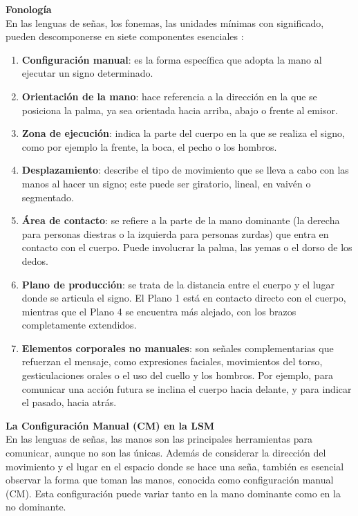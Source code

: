 \textbf{Fonología}\\
En las lenguas de señas, los fonemas, las unidades mínimas con significado, pueden descomponerse en siete componentes esenciales \cite{ref39}:

\begin{enumerate}
    \item \textbf{Configuración manual}: es la forma específica que adopta la mano al ejecutar un signo determinado.
    \item \textbf{Orientación de la mano}: hace referencia a la dirección en la que se posiciona la palma, ya sea orientada hacia arriba, abajo o frente al emisor.
    \item \textbf{Zona de ejecución}: indica la parte del cuerpo en la que se realiza el signo, como por ejemplo la frente, la boca, el pecho o los hombros.
    \item \textbf{Desplazamiento}: describe el tipo de movimiento que se lleva a cabo con las manos al hacer un signo; este puede ser giratorio, lineal, en vaivén o segmentado.
    \item \textbf{Área de contacto}: se refiere a la parte de la mano dominante (la derecha para personas diestras o la izquierda para personas zurdas) que entra en contacto con el cuerpo. Puede involucrar la palma, las yemas o el dorso de los dedos.
    \item \textbf{Plano de producción}: se trata de la distancia entre el cuerpo y el lugar donde se articula el signo. El Plano 1 está en contacto directo con el cuerpo, mientras que el Plano 4 se encuentra más alejado, con los brazos completamente extendidos.
    \item \textbf{Elementos corporales no manuales}: son señales complementarias que refuerzan el mensaje, como expresiones faciales, movimientos del torso, gesticulaciones orales o el uso del cuello y los hombros. Por ejemplo, para comunicar una acción futura se inclina el cuerpo hacia delante, y para indicar el pasado, hacia atrás.\\
\end{enumerate}

\textbf{La Configuración Manual (CM) en la LSM}\\
En las lenguas de señas, las manos son las principales herramientas para comunicar, aunque no son las únicas. Además de considerar la dirección del movimiento y el lugar en el espacio donde se hace una seña, también es esencial observar la forma que toman las manos, conocida como configuración manual (CM). Esta configuración puede variar tanto en la mano dominante como en la no dominante.\\


